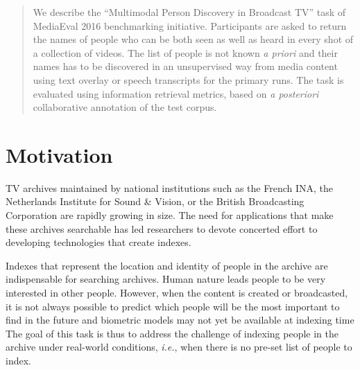 \documentclass{acm_proc_article-me}
\begin{document}
\maketitle
\begin{abstract}
We describe the ``Multimodal Person Discovery in Broadcast TV'' task of MediaEval 2016 benchmarking initiative. Participants are asked to return the names of people who can be both seen as well as heard in every shot of a collection of videos. The list of people is not known \emph{a priori} and their names has to be discovered in an unsupervised way from media content using text overlay or speech transcripts for the primary runs. The task is evaluated using information retrieval metrics, based on \emph{a posteriori} collaborative annotation of the test corpus.
\end{abstract}

\vspace{-0.1cm}
\section{Motivation}

TV archives maintained by national institutions such as the French INA, the Netherlands Institute for Sound \& Vision, or the British Broadcasting Corporation are rapidly growing in size. The need for applications that make these archives searchable has led researchers to devote concerted effort to developing technologies that create indexes.

Indexes that represent the location and identity of people in the archive are indispensable for searching archives. Human nature leads people to be very interested in other people. However, when the content is created or broadcasted, it is not always possible to predict which people will be the most important to find in the future
and biometric models may not yet be available at indexing time
The goal of this task is thus to address the challenge of indexing people in the archive under real-world conditions, \emph{i.e.}, when there is no pre-set list of people to index.
\end{document}
